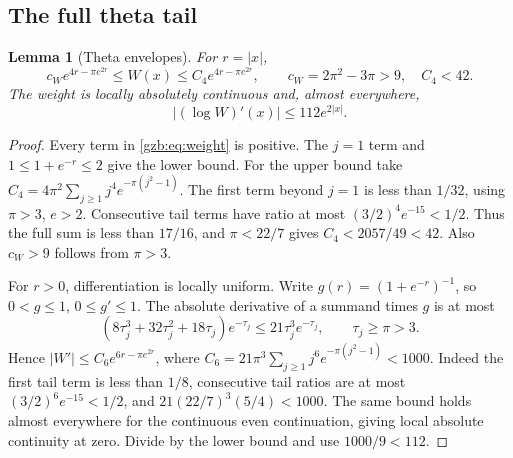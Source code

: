 \documentclass[11pt,a4paper]{article}
\numberwithin{equation}{section}
\newtheorem{lemma}[theorem]{Lemma}
\theoremstyle{definition}\newtheorem{definition}[theorem]{Definition}
\theoremstyle{remark}\newtheorem{remark}[theorem]{Remark}
\begin{document}
\subsection{The full theta tail}
\begin{lemma}[Theta envelopes]\label{gzb:lem:theta}
For $r=|x|$,
\begin{equation}\label{gzb:eq:theta-envelope}
 c_W e^{4r-\pi e^{2r}}\le W(x)\le C_4 e^{4r-\pi e^{2r}},
 \qquad c_W=2\pi^2-3\pi>9,\quad C_4<42.
\end{equation}
The weight is locally absolutely continuous and, almost everywhere,
\begin{equation}\label{gzb:eq:logW}
 |(\log W)'(x)|\le112e^{2|x|}.
\end{equation}
\end{lemma}
\begin{proof}
Every term in \eqref{gzb:eq:weight} is positive. The $j=1$ term and
$1\le1+e^{-r}\le2$ give the lower bound.
For the upper bound take
$C_4=4\pi^2\sum_{j\ge1}j^4e^{-\pi(j^2-1)}$.
The first term beyond $j=1$ is less than $1/32$, using $\pi>3$, $e>2$.
Consecutive tail terms have ratio at most $(3/2)^4e^{-15}<1/2$.
Thus the full sum is less than $17/16$, and $\pi<22/7$ gives
$C_4<2057/49<42$. Also $c_W>9$ follows from $\pi>3$.

For $r>0$, differentiation is locally uniform. Write
$g(r)=(1+e^{-r})^{-1}$, so $0<g\le1$, $0\le g'\le1$.
The absolute derivative of a summand times $g$ is at most
\[
 (8\tau_j^3+32\tau_j^2+18\tau_j)e^{-\tau_j}
       \le21\tau_j^3e^{-\tau_j},\qquad \tau_j\ge\pi>3.
\]
Hence $|W'|\le C_6e^{6r-\pi e^{2r}}$, where
$C_6=21\pi^3\sum_{j\ge1}j^6e^{-\pi(j^2-1)}<1000$.
Indeed the first tail term is less than $1/8$, consecutive tail ratios
are at most $(3/2)^6e^{-15}<1/2$, and
$21(22/7)^3(5/4)<1000$.
The same bound holds almost everywhere for the continuous even
continuation, giving local absolute continuity at zero.
Divide by the lower bound and use $1000/9<112$.
\end{proof}
\end{document}
